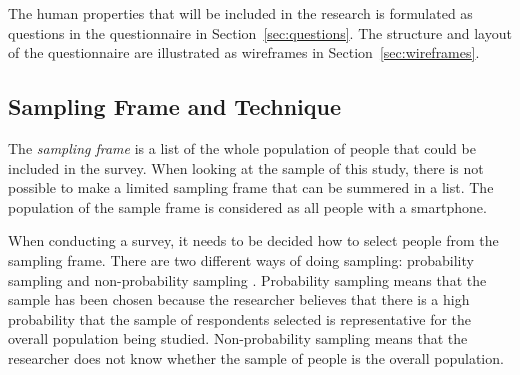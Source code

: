     The human properties that will be included in the research is formulated as questions in the questionnaire in Section~\ref{sec:questions}. The structure and layout of the questionnaire are illustrated as wireframes in Section~\ref{sec:wireframes}.
    
    \subsection{Sampling Frame and Technique} \label{sec:sampling}
      
    The {\it sampling frame} is a list of the whole population of people that could be included in the survey. When looking at the sample of this study, there is not possible to make a limited sampling frame that can be summered in a list. The population of the sample frame is considered as all people with a smartphone.
      
    When conducting a survey, it needs to be decided how to select people from the sampling frame. There are two different ways of doing sampling: probability sampling and non-probability sampling \cite{empiriske}. Probability sampling means that the sample has been chosen because the researcher believes that there is a high probability that the sample of respondents selected is representative for the overall population being studied. Non-probability sampling means that the researcher does not know whether the sample of people is the overall population.

